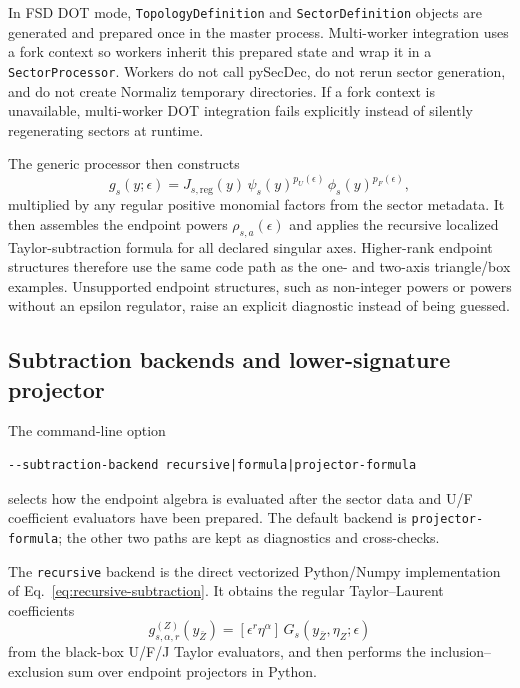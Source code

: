 \documentclass[11pt]{article}
\newcommand{\eps}{\epsilon}
\begin{document}
In FSD DOT mode, \texttt{TopologyDefinition} and \texttt{SectorDefinition}
objects are generated and prepared once in the master process.  Multi-worker
integration uses a fork context so workers inherit this prepared state and
wrap it in a \texttt{SectorProcessor}.  Workers do not call pySecDec, do not
rerun sector generation, and do not create Normaliz temporary directories.  If
a fork context is unavailable, multi-worker DOT integration fails explicitly
instead of silently regenerating sectors at runtime.

The generic processor then constructs
\begin{equation}
  g_s(y;\eps)
  =
  J_{s,\mathrm{reg}}(y)\,
  \psi_s(y)^{p_U(\eps)}\,
  \phi_s(y)^{p_F(\eps)},
\end{equation}
multiplied by any regular positive monomial factors from the sector metadata.
It then assembles the endpoint powers \(\rho_{s,a}(\eps)\) and applies the
recursive localized Taylor-subtraction formula for all declared singular axes.
Higher-rank endpoint structures therefore use the same code path as the
one- and two-axis triangle/box examples.  Unsupported endpoint structures,
such as non-integer powers or powers without an epsilon regulator, raise an
explicit diagnostic instead of being guessed.

\subsection{Subtraction backends and lower-signature projector}

The command-line option
\begin{lstlisting}[style=fsdcode]
--subtraction-backend recursive|formula|projector-formula
\end{lstlisting}
selects how the endpoint algebra is evaluated after the sector data and U/F
coefficient evaluators have been prepared.
The default backend is \texttt{projector-formula}; the other two paths are kept
as diagnostics and cross-checks.

The \texttt{recursive} backend is the direct vectorized Python/Numpy
implementation of Eq.~\eqref{eq:recursive-subtraction}.  It obtains the
regular Taylor--Laurent coefficients
\begin{equation}
  g_{s,\alpha,r}^{(Z)}(y_{\bar Z})
  =
  [\eps^r \eta^\alpha]\,
  G_s\!\left(
    y_{\bar Z},\eta_Z;\eps
  \right)
\end{equation}
from the black-box U/F/J Taylor evaluators, and then performs the
inclusion--exclusion sum over endpoint projectors in Python.
\end{document}
